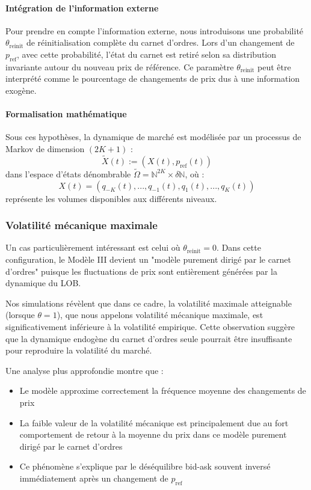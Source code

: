 \documentclass[12pt,a4paper]{article}
\theoremstyle{definition}
\theoremstyle{remark}
\begin{document}
    \paragraph{Intégration de l'information externe}
    Pour prendre en compte l'information externe, nous introduisons une probabilité $\theta_{\text{reinit}}$ de réinitialisation complète du carnet d'ordres. Lors d'un changement de $p_{\text{ref}}$, avec cette probabilité, l'état du carnet est retiré selon sa distribution invariante autour du nouveau prix de référence. Ce paramètre $\theta_{\text{reinit}}$ peut être interprété comme le pourcentage de changements de prix dus à une information exogène.

    \paragraph{Formalisation mathématique}
    Sous ces hypothèses, la dynamique de marché est modélisée par un processus de Markov de dimension $(2K+1)$ :
    $$\tilde{X}(t) := (X(t), p_{\text{ref}}(t))$$
    dans l'espace d'états dénombrable $\tilde{\Omega} = \mathbb{N}^{2K} \times \delta\mathbb{N}$, où :
    $$X(t) = (q_{-K}(t), ..., q_{-1}(t), q_1(t), ..., q_K(t))$$
    représente les volumes disponibles aux différents niveaux.

    \subsubsection{Volatilité mécanique maximale}

    Un cas particulièrement intéressant est celui où $\theta_{\text{reinit}}=0$. Dans cette configuration, le Modèle III devient un "modèle purement dirigé par le carnet d'ordres" puisque les fluctuations de prix sont entièrement générées par la dynamique du LOB.

    Nos simulations révèlent que dans ce cadre, la volatilité maximale atteignable (lorsque $\theta=1$), que nous appelons volatilité mécanique maximale, est significativement inférieure à la volatilité empirique. Cette observation suggère que la dynamique endogène du carnet d'ordres seule pourrait être insuffisante pour reproduire la volatilité du marché.

    Une analyse plus approfondie montre que :
    \begin{itemize}
        \item Le modèle approxime correctement la fréquence moyenne des changements de prix
        \item La faible valeur de la volatilité mécanique est principalement due au fort comportement de retour à la moyenne du prix dans ce modèle purement dirigé par le carnet d'ordres
        \item Ce phénomène s'explique par le déséquilibre bid-ask souvent inversé immédiatement après un changement de $p_{\text{ref}}$
    \end{itemize}
\end{document}
